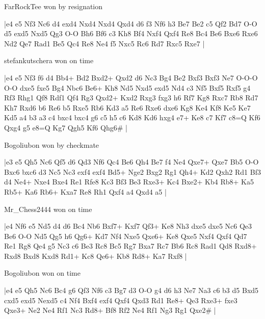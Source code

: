 \showboard

FarRockTee won by resignation

\makegametitle
|e4 e5 Nf3 Nc6 d4 exd4 Nxd4 Nxd4 Qxd4 d6 f3 Nf6 h3 Be7 Be2 c5 Qf2 Bd7 O-O d5 exd5 Nxd5 Qg3 O-O Bh6 Bf6 c3 Kh8 Bf4 Nxf4 Qxf4 Re8 Bc4 Be6 Bxe6 Rxe6 Nd2 Qe7 Rad1 Be5 Qc4 Re8 Ne4 f5 Nxc5 Rc6 Rd7 Rxc5 Rxe7  |

\showboard

stefankutschera won on time

\makegametitle
|e4 e5 Nf3 f6 d4 Bb4+ Bd2 Bxd2+ Qxd2 d6 Nc3 Bg4 Be2 Bxf3 Bxf3 Ne7 O-O-O O-O dxe5 fxe5 Bg4 Nbc6 Be6+ Kh8 Nd5 Nxd5 exd5 Nd4 c3 Nf5 Bxf5 Rxf5 g4 Rf3 Rhg1 Qf8 Rdf1 Qf4 Rg3 Qxd2+ Kxd2 Rxg3 fxg3 h6 Rf7 Kg8 Rxc7 Rb8 Rd7 Kh7 Rxd6 b6 Re6 b5 Rxe5 Rb6 Kd3 a5 Re6 Rxe6 dxe6 Kg8 Ke4 Kf8 Ke5 Ke7 Kd5 a4 b3 a3 c4 bxc4 bxc4 g6 c5 h5 c6 Kd8 Kd6 hxg4 e7+ Ke8 c7 Kf7 c8=Q Kf6 Qxg4 g5 e8=Q Kg7 Qgh5 Kf6 Qhg6\#  |

\showboard

Bogoliubon won by checkmate

\makegametitle
|e3 e5 Qh5 Nc6 Qf5 d6 Qd3 Nf6 Qc4 Be6 Qh4 Be7 f4 Ne4 Qxe7+ Qxe7 Bb5 O-O Bxc6 bxc6 d3 Nc5 Nc3 exf4 exf4 Bd5+ Nge2 Bxg2 Rg1 Qh4+ Kd2 Qxh2 Rd1 Bf3 d4 Ne4+ Nxe4 Bxe4 Re1 Rfe8 Kc3 Bf3 Be3 Rxe3+ Kc4 Bxe2+ Kb4 Rb8+ Ka5 Rb5+ Ka6 Rb6+ Kxa7 Re8 Rh1 Qxf4 a4 Qxd4 a5  |

\showboard

Mr\_Chess2444 won on time

\makegametitle
|e4 Nf6 e5 Nd5 d4 d6 Bc4 Nb6 Bxf7+ Kxf7 Qf3+ Ke8 Nh3 dxe5 dxe5 Nc6 Qe3 Be6 O-O Nd5 Qg5 h6 Qg6+ Kd7 Nf4 Nxe5 Qxe6+ Ke8 Qxe5 Nxf4 Qxf4 Qd7 Re1 Rg8 Qe4 g5 Nc3 c6 Be3 Rc8 Bc5 Rg7 Bxa7 Rc7 Bb6 Rc8 Rad1 Qd8 Rxd8+ Rxd8 Bxd8 Kxd8 Rd1+ Kc8 Qe6+ Kb8 Rd8+ Ka7 Rxf8  |

\showboard

Bogoliubon won on time

\makegametitle
|e4 e5 Qh5 Nc6 Bc4 g6 Qf3 Nf6 c3 Bg7 d3 O-O g4 d6 h3 Ne7 Na3 c6 b3 d5 Bxd5 cxd5 exd5 Nexd5 c4 Nf4 Bxf4 exf4 Qxf4 Qxd3 Rd1 Re8+ Qe3 Rxe3+ fxe3 Qxe3+ Ne2 Ne4 Rf1 Nc3 Rd8+ Bf8 Rf2 Ne4 Rf1 Ng3 Rg1 Qxe2\#  |


